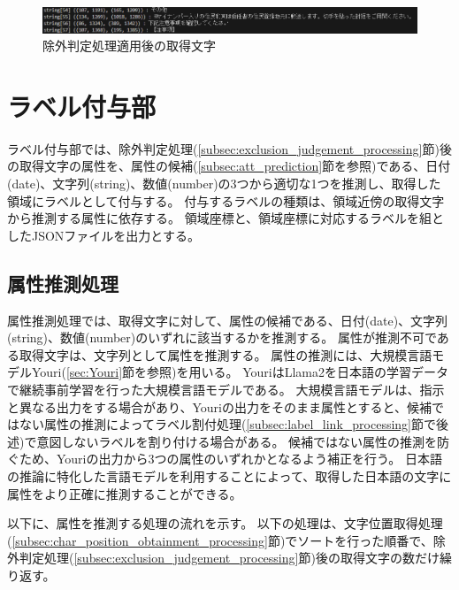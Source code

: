 \begin{figure}[t]
    \begin{center}
        \includegraphics[width=15cm]{image/04-implementation/after_exclusion_string.png}
        \caption{除外判定処理適用後の取得文字}
        \label{fig:after_exclusion_string}
    \end{center}
\end{figure}

\section{ラベル付与部}\label{sec:label_link_part}
ラベル付与部では、除外判定処理(\ref{subsec:exclusion_judgement_processing}節)後の取得文字の属性を、属性の候補(\ref{subsec:att_prediction}節を参照)である、日付(date)、文字列(string)、数値(number)の3つから適切な1つを推測し、取得した領域にラベルとして付与する。
付与するラベルの種類は、領域近傍の取得文字から推測する属性に依存する。
領域座標と、領域座標に対応するラベルを組としたJSONファイルを出力とする。

\subsection{属性推測処理}\label{subsec:att_prediction_processing}
属性推測処理では、取得文字に対して、属性の候補である、日付(date)、文字列(string)、数値(number)のいずれに該当するかを推測する。
属性が推測不可である取得文字は、文字列として属性を推測する。
属性の推測には、大規模言語モデルYouri(\ref{sec:Youri}節を参照)を用いる。
YouriはLlama2を日本語の学習データで継続事前学習を行った大規模言語モデルである。
大規模言語モデルは、指示と異なる出力をする場合があり、Youriの出力をそのまま属性とすると、候補ではない属性の推測によってラベル割付処理(\ref{subsec:label_link_processing}節で後述)で意図しないラベルを割り付ける場合がある。
候補ではない属性の推測を防ぐため、Youriの出力から3つの属性のいずれかとなるよう補正を行う。
日本語の推論に特化した言語モデルを利用することによって、取得した日本語の文字に属性をより正確に推測することができる。

以下に、属性を推測する処理の流れを示す。
以下の処理は、文字位置取得処理(\ref{subsec:char_position_obtainment_processing}節)でソートを行った順番で、除外判定処理(\ref{subsec:exclusion_judgement_processing}節)後の取得文字の数だけ繰り返す。

